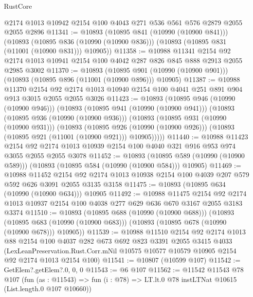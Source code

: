 \begin{lexlean}{RustCore}
\begin{coremodule}
    @2174
    @1013
    @10942
    @2154
    @100
    @4043
    @271
    @536
    @561
    @576
    @2879
    @2055
    @2055
    @2896
@11341 := @10893
    (@10895 @841 (@10990 (@10900 @841)))
    (@10893
      (@10895 @836 (@10990 (@10900 @836)))
      (@10893 (@10895 @831 (@11001 (@10900 @831))) @10905))
@11358 := @10988
    @11341
    @2154
    @92
    @2174
    @1013
    @10941
    @2154
    @100
    @4042
    @287
    @826
    @845
    @888
    @2913
    @2055
    @2985
    @3002
@11370 := @10893
    (@10895 @901 (@10990 (@10900 @901)))
    (@10893 (@10895 @896 (@11001 (@10900 @896))) @10905)
@11387 := @10988
    @11370
    @2154
    @92
    @2174
    @1013
    @10940
    @2154
    @100
    @4041
    @251
    @891
    @904
    @913
    @3015
    @2055
    @2055
    @3026
@11423 := @10893
    (@10895 @946 (@10990 (@10900 @946)))
    (@10893
      (@10895 @941 (@10990 (@10900 @941)))
      (@10893
        (@10895 @936 (@10990 (@10900 @936)))
        (@10893
          (@10895 @931 (@10990 (@10900 @931)))
          (@10893
            (@10895 @926 (@10990 (@10900 @926)))
            (@10893 (@10895 @921 (@11001 (@10900 @921))) @10905)))))
@11440 := @10988
    @11423
    @2154
    @92
    @2174
    @1013
    @10939
    @2154
    @100
    @4040
    @321
    @916
    @953
    @974
    @3055
    @2055
    @2055
    @3078
@11452 := @10893
    (@10895 @589 (@10990 (@10900 @589)))
    (@10893 (@10895 @584 (@10990 (@10900 @584))) @10905)
@11469 := @10988
    @11452
    @2154
    @92
    @2174
    @1013
    @10938
    @2154
    @100
    @4039
    @207
    @579
    @592
    @626
    @3091
    @2055
    @3135
    @3158
@11475 := @10893 (@10895 @634 (@10990 (@10900 @634))) @10905
@11492 := @10988
    @11475
    @2154
    @92
    @2174
    @1013
    @10937
    @2154
    @100
    @4038
    @277
    @629
    @636
    @670
    @3167
    @2055
    @3183
    @3374
@11510 := @10893
    (@10895 @688 (@10990 (@10900 @688)))
    (@10893
      (@10895 @683 (@10990 (@10900 @683)))
      (@10893 (@10895 @678 (@10990 (@10900 @678))) @10905))
@11539 := @10988
    @11510
    @2154
    @92
    @2174
    @1013
    @88
    @2154
    @100
    @4037
    @282
    @673
    @692
    @823
    @3391
    @2055
    @3415
    @4033
    (LexLeanPreservation.Rust.Corr.mNil
      @10575
      @10577
      @10579
      @10905
      @2154
      @92
      @2174
      @1013
      @2154
      @100)
@11541 := @10807 (@10599 @107)
@11542 := GetElem?.getElem?.{0, 0, 0}
@11543 := @6 @107
@11562 := @11542
    @11543
    @78
    @107
    (fun (as : @11543) =>
    fun (i : @78) => LT.lt.{0} @78 instLTNat @10615 (List.length.{0} @107 @10660))

\end{coremodule}
\end{lexlean}
